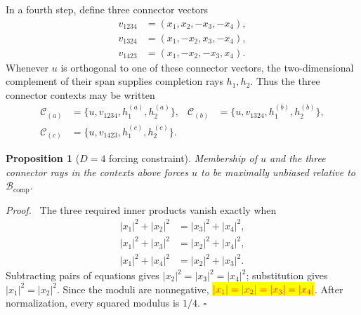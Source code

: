 \documentclass[%
  reprint,
  superscriptaddress,
  showpacs,
  showkeys,
  amsmath,amssymb,
  pra,
  longbibliography,
  floatfix,
  x11names
]{revtex4-2}
\newenvironment{revision}{\begingroup\color{revisionblue}}{\endgroup}
\newcommand{\corrmath}[1]{\begingroup\setlength{\fboxsep}{1pt}\colorbox{yellow}{\ensuremath{\color{red}#1}}\endgroup}
\newtheorem{proposition}{Proposition}
\newenvironment{proof}{\par\noindent\textit{Proof.}\ }{\hfill$\square$\par}
\begin{document}
In a fourth step, define three connector vectors
\begin{align*}
v_{1234}&=(x_1,x_2,-x_3,-x_4),\\
v_{1324}&=(x_1,-x_2,x_3,-x_4),\\
v_{1423}&=(x_1,-x_2,-x_3,x_4).
\end{align*}
\begin{revision}
Whenever $u$ is orthogonal to one of these connector vectors, the two-dimensional complement of their span supplies completion rays $h_1,h_2$.  Thus the three connector contexts may be written
\begin{align*}
\mathcal{C}_{(a)}&=\{u,v_{1234},h^{(a)}_1,h^{(a)}_2\},&
\mathcal{C}_{(b)}&=\{u,v_{1324},h^{(b)}_1,h^{(b)}_2\},\\
\mathcal{C}_{(c)}&=\{u,v_{1423},h^{(c)}_1,h^{(c)}_2\}.
\end{align*}

\begin{proposition}[$D=4$ forcing constraint]
\label{prop:D4forcing}
Membership of $u$ and the three connector rays in the contexts above forces $u$ to be maximally unbiased relative to $\mathcal{B}_{\mathrm{comp}}$.
\end{proposition}

\begin{proof}
The three required inner products vanish exactly when
\begin{align}
|x_1|^2+|x_2|^2&=|x_3|^2+|x_4|^2, \label{eq:D4a}\\
|x_1|^2+|x_3|^2&=|x_2|^2+|x_4|^2, \label{eq:D4b}\\
|x_1|^2+|x_4|^2&=|x_2|^2+|x_3|^2. \label{eq:D4c}
\end{align}
Subtracting pairs of equations gives $|x_2|^2=|x_3|^2=|x_4|^2$; substitution gives $|x_1|^2=|x_2|^2$.  Since the moduli are nonnegative, \corrmath{|x_1|=|x_2|=|x_3|=|x_4|}.  After normalization, every squared modulus is $1/4$.
\end{proof}


\end{revision}
\end{document}
